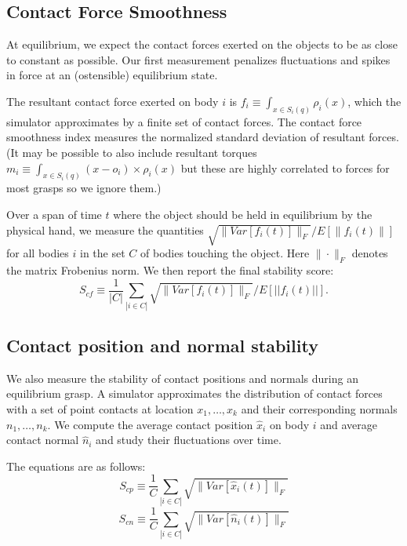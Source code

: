 \subsection{Contact Force Smoothness}

At equilibrium, we expect the contact forces exerted on the objects to be as close to constant as possible. Our first measurement penalizes fluctuations and spikes in force at an (ostensible) equilibrium state. 

The resultant contact force exerted on body $i$  is $f_i \equiv \int_{x\in S_i(q)} \rho_i(x)$, which the simulator approximates by a finite set of contact forces.  The contact force smoothness index measures the normalized standard deviation of resultant forces. (It may be possible to also include resultant torques  $m_i \equiv \int_{x\in S_i(q)} (x-o_i) \times \rho_i(x)$ but these are highly correlated to forces for most grasps so we ignore them.) 

Over a span of time $t$ where the object should be held in equilibrium by the physical hand, we measure the quantities $\sqrt{\|Var[f_i(t)]\|_F} / E[\|f_i(t)\|]$ for all bodies $i$ in the set $C$ of bodies touching the object.  Here $\|\cdot\|_F$ denotes the matrix Frobenius norm. We then report the final stability score:
\begin{equation}
S_{cf} \equiv \frac{1}{|C|} \sum_{|i\in C|} \sqrt{\|Var[f_i(t)]\|_F} / E[||f_i(t)||].
\end{equation}

\subsection{Contact position and normal stability}
We also measure the stability of contact positions and normals during an equilibrium grasp.  A simulator approximates the distribution of contact forces with a set of point contacts at location $x_1,\ldots,x_k$ and their corresponding normals $n_1,\ldots,n_k$.  We compute the average contact position $\hat{x}_i$ on body $i$ and average contact normal $\hat{n}_i$ and study their fluctuations over time.

The equations are as follows:
\begin{equation}
S_{cp} \equiv \frac{1}{C} \sum_{|i\in C|} \sqrt{\|Var[\hat{x}_i(t)]\|_F}
\end{equation}
\begin{equation}
S_{cn} \equiv \frac{1}{C} \sum_{|i\in C|} \sqrt{\|Var[\hat{n}_i(t)]\|_F}
\end{equation}

